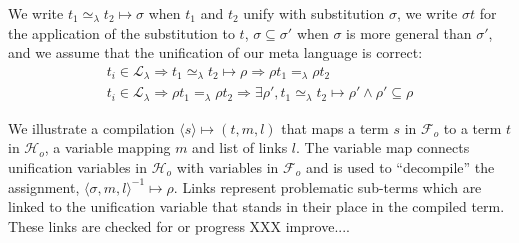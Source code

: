 \documentclass[sigconf,natbib=false]{acmart}
\newcommand{\EqualRel}{\ensuremath{=}}
\newcommand{\UnifRel}{\ensuremath{\simeq}}
\newcommand{\Ue}{\ensuremath{\UnifRel_\lambda}\xspace}
\newcommand{\Ee}{\ensuremath{\EqualRel_\lambda}\xspace}
\newcommand{\llambda}{\ensuremath{\mathcal{L}_\lambda}\xspace}
\newcommand{\Fo}{\ensuremath{\mathcal{F}_{\!o}\xspace}} %
\newcommand{\Ho}{\ensuremath{\mathcal{H}_o}\xspace}
\begin{document}
\newcommand{\unifcorrect}[3]{
    #3_i \in \llambda \Rightarrow
      #3_1 #2 #3_2 \mapsto \rho
        \Rightarrow 
          \rho #3_1 #1 \rho #3_2  %
}

\newcommand{\unifcomplete}[3]{
    #3_i \in \llambda \Rightarrow
        \rho #3_1 #1 \rho #3_2  %
          \Rightarrow \exists \rho', #3_1 #2 #3_2 \mapsto \rho' \land \rho' \subseteq \rho 
}

We write $t_1 \Ue t_2 \mapsto \sigma$ when $t_1$ and $t_2$ unify with substitution
$\sigma$, we write $\sigma t$ for the application of the substitution to
$t$, $\sigma \subseteq \sigma'$ when $\sigma$ is more general than $\sigma'$,
and we assume that the unification of our meta language is correct:
%
\begin{gather}
  \unifcorrect{\Ee}{\Ue}{t} \label{prop:correct-ml}\\
  \unifcomplete{\Ee}{\Ue}{t}
\end{gather}

\newcommand{\C}[4]{\ensuremath{\langle #1 \rangle}\mapsto(#2,#3,#4)}
\newcommand{\D}[4]{\ensuremath{\langle #1,#2,#3 \rangle^{-1}\mapsto #4}}

We illustrate a compilation $\C{s}{t}{m}{l}$ that
maps a term $s$ in \Fo{} to a term $t$ in \Ho, a variable mapping $m$ and
list of links $l$.
The variable map connects unification variables in \Ho with variables
in \Fo{} and is used to ``decompile'' the assignment,
$\D{\sigma}{m}{l}{\rho}$. Links represent problematic sub-terms which
are linked to the unification variable that stands in their place in the
compiled term. These links are checked for or progress XXX improve....
\end{document}

